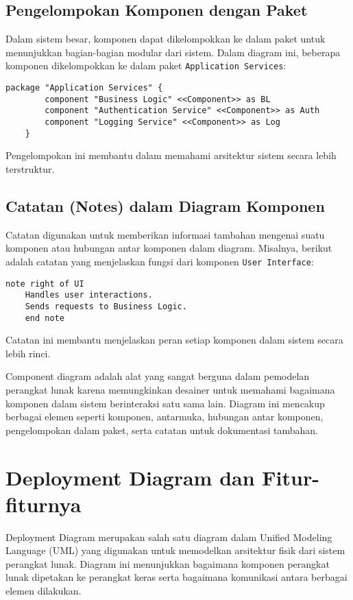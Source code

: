 \subsection{Pengelompokan Komponen dengan Paket}
Dalam sistem besar, komponen dapat dikelompokkan ke dalam paket untuk menunjukkan bagian-bagian modular dari sistem. Dalam diagram ini, beberapa komponen dikelompokkan ke dalam paket \texttt{Application Services}:
\begin{lstlisting}[language=puml]
	package "Application Services" {
		component "Business Logic" <<Component>> as BL
		component "Authentication Service" <<Component>> as Auth
		component "Logging Service" <<Component>> as Log
	}
\end{lstlisting}
Pengelompokan ini membantu dalam memahami arsitektur sistem secara lebih terstruktur.

\subsection{Catatan (Notes) dalam Diagram Komponen}
Catatan digunakan untuk memberikan informasi tambahan mengenai suatu komponen atau hubungan antar komponen dalam diagram. Misalnya, berikut adalah catatan yang menjelaskan fungsi dari komponen \texttt{User Interface}:
\begin{lstlisting}[language=puml]
	note right of UI
	Handles user interactions.
	Sends requests to Business Logic.
	end note
\end{lstlisting}
Catatan ini membantu menjelaskan peran setiap komponen dalam sistem secara lebih rinci.


Component diagram adalah alat yang sangat berguna dalam pemodelan perangkat lunak karena memungkinkan desainer untuk memahami bagaimana komponen dalam sistem berinteraksi satu sama lain. Diagram ini mencakup berbagai elemen seperti komponen, antarmuka, hubungan antar komponen, pengelompokan dalam paket, serta catatan untuk dokumentasi tambahan.


\section{Deployment Diagram dan Fitur-fiturnya}

Deployment Diagram merupakan salah satu diagram dalam Unified Modeling Language (UML) yang digunakan untuk memodelkan arsitektur fisik dari sistem perangkat lunak. Diagram ini menunjukkan bagaimana komponen perangkat lunak dipetakan ke perangkat keras serta bagaimana komunikasi antara berbagai elemen dilakukan.

